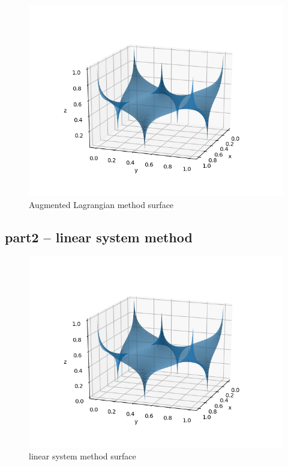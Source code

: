\documentclass{article}
\begin{document}
\begin{figure}[h]
      \centering
      \includegraphics{figures/Figure_1.png}
      \caption{Augmented  Lagrangian  method surface}
\end{figure}


\subsection{part2 -- linear system  method }

\begin{figure}[h]
      \centering
      \includegraphics{figures/Figure_2.png}
      \caption{linear system method surface}
\end{figure}
\end{document}
